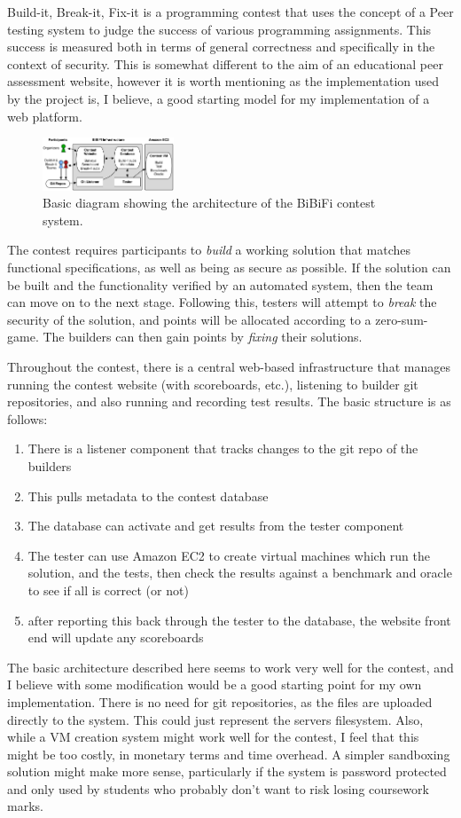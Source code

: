 \documentclass[a4paper,11pt]{report}
\begin{document}
Build-it, Break-it, Fix-it\cite{ruef_build_2016} is a programming contest that uses the concept of a Peer testing system to judge the success of various programming assignments. This success is measured both in terms of general correctness and specifically in the context of security. This is somewhat different to the aim of an educational peer assessment website, however it is worth mentioning as the implementation used by the project is, I believe, a good starting model for my implementation of a web platform.\par
\begin{figure}
\centering
\includegraphics[width=0.35\textwidth]{bibifi.png}
\caption{\footnotesize Basic diagram showing the architecture of the BiBiFi contest system.}
\end{figure}
The contest requires participants to \textit{build} a working solution that matches functional specifications, as well as being as secure as possible. If the solution can be built and the functionality verified by an automated system, then the team can move on to the next stage. Following this, testers will attempt to \textit{break} the security of the solution, and points will be allocated according to a zero-sum-game. The builders can then gain points by \textit{fixing} their solutions.\par
Throughout the contest, there is a central web-based infrastructure that manages running the contest website (with scoreboards, etc.), listening to builder git repositories, and also running and recording test results. The basic structure is as follows:
\begin{enumerate}
 \item There is a listener component that tracks changes to the git repo of the builders
 \item This pulls metadata to the contest database
 \item The database can activate and get results from the tester component
 \item The tester can use Amazon EC2 to create virtual machines which run the solution, and the tests, then check the results against a benchmark and oracle to see if all is correct (or not)
 \item after reporting this back through the tester to the database, the website front end will update any scoreboards
\end{enumerate}
The basic architecture described here seems to work very well for the contest, and I believe with some modification would be a good starting point for my own implementation. There is no need for git repositories, as the files are uploaded directly to the system. This could just represent the servers filesystem. Also, while a VM creation system might work well for the contest, I feel that this might be too costly, in monetary terms and time overhead. A simpler sandboxing solution might make more sense, particularly if the system is password protected and only used by students who probably don't want to risk losing coursework marks.
\end{document}

